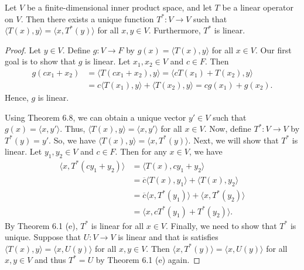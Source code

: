 \begin{theorem}
    Let \( V  \) be a finite-dimensional inner product space, and let \( T  \) be a linear operator on \( V  \). Then there exists a unique function \( T^{*}: V \to V  \) such that \( \langle T(x) , y \rangle = \langle x , T^{*}(y)  \rangle \) for all \( x,y \in V  \). Furthermore, \( T^{*}  \) is linear.
\end{theorem}
\begin{proof}
Let \( y \in V  \). Define \( g: V \to F  \) by \( g(x) = \langle T(x) , y \rangle \) for all \( x \in V  \). Our first goal is to show that \( g  \) is linear. Let \( {x}_{1}, {x}_{2} \in V  \) and \( c \in F  \). Then
\begin{align*}
    g({cx}_{1} + {x}_{2}) &= \langle T({cx}_{1} + {x}_{2}) , y \rangle = \langle c T({x}_{1})  + T({x}_{2}), y \rangle \\
                          &= c \langle T({x}_{1}) , y \rangle + \langle T({x}_{2}) , y \rangle = c g({x}_{1}) + g({x}_{2}). 
\end{align*}
Hence, \( g  \) is linear.

Using Theorem 6.8, we can obtain a unique vector \( y' \in V \) such that \( g(x) = \langle x , y' \rangle \). Thus, \( \langle T(x) , y \rangle = \langle x , y' \rangle \) for all \( x \in V  \). Now, define \( T^{*}: V \to V  \) by \( T^{*}(y) = y' \). So, we have \( \langle T(x) , y \rangle = \langle x , T^{*}(y) \rangle \).
    Next, we will show that \( T^{*} \) is linear. Let \( {y}_{1}, {y}_{2} \in V  \) and \( c \in F  \). Then for any \( x \in V  \), we have
    \begin{align*}
        \langle x , T^{*}({cy}_{1} + {y}_{2}) \rangle &= \langle T(x) , {cy}_{1} + {y}_{2} \rangle \\
                                                      &= \overline{c} \langle T(x) , {y}_{1} \rangle + \langle T(x) , {y}_{2} \rangle \\ 
                                                      &= \overline{c} \langle x , T^{*}({y}_{1}) \rangle + \langle x ,  T^{*}({y}_{2}) \rangle \\
                                                      &= \langle x , c T^{*}({y}_{1}) + T^{*}({y}_{2}) \rangle.
    \end{align*}
    By Theorem 6.1 (e), \( T^{*}  \) is linear for all \( x \in V  \). 
    Finally, we need to show that \( T^{*}  \) is unique. Suppose that \( U: V \to V  \) is linear and that is satisfies \( \langle T(x) , y \rangle = \langle x , U(y) \rangle \) for all \( x,y \in V  \). Then \( \langle x , T^{*}(y) \rangle = \langle x , U(y) \rangle \) for all \( x,y \in V  \) and thus \( T^{*} = U  \) by Theorem 6.1 (e) again.
\end{proof}

